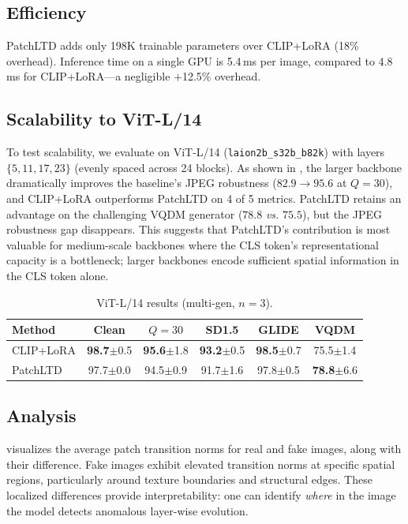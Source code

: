 \documentclass[runningheads]{llncs}
\newcommand{\ours}{PatchLTD}
\newcommand{\vs}{\textit{vs.}}
\begin{document}
\subsection{Efficiency}

\ours{} adds only 198K trainable parameters over CLIP+LoRA (18\% overhead).
Inference time on a single GPU is 5.4\,ms per image, compared to 4.8\,ms for CLIP+LoRA---a negligible $+$12.5\% overhead.


\subsection{Scalability to ViT-L/14}
\label{sec:vitl}

To test scalability, we evaluate on ViT-L/14 (\texttt{laion2b\_s32b\_b82k}) with layers $\{5,11,17,23\}$ (evenly spaced across 24 blocks).
As shown in , the larger backbone dramatically improves the baseline's JPEG robustness ($82.9 \to 95.6$ at $Q{=}30$), and CLIP+LoRA outperforms \ours{} on 4 of 5 metrics.
\ours{} retains an advantage on the challenging VQDM generator ($78.8$ \vs{} $75.5$), but the JPEG robustness gap disappears.
This suggests that \ours{}'s contribution is most valuable for medium-scale backbones where the CLS token's representational capacity is a bottleneck; larger backbones encode sufficient spatial information in the CLS token alone.

\begin{table}[t]
\centering
\caption{ViT-L/14 results (multi-gen, $n{=}3$).}
\label{tab:vitl}
\setlength{\tabcolsep}{4pt}
\begin{tabular}{lccccc}
\toprule
Method & Clean & $Q{=}30$ & SD1.5 & GLIDE & VQDM \\
\midrule
CLIP+LoRA  & \textbf{98.7}\scriptsize$\pm$0.5 & \textbf{95.6}\scriptsize$\pm$1.8 & \textbf{93.2}\scriptsize$\pm$0.5 & \textbf{98.5}\scriptsize$\pm$0.7 & 75.5\scriptsize$\pm$1.4 \\
\ours{}    & 97.7\scriptsize$\pm$0.0 & 94.5\scriptsize$\pm$0.9 & 91.7\scriptsize$\pm$1.6 & 97.8\scriptsize$\pm$0.5 & \textbf{78.8}\scriptsize$\pm$6.6 \\
\bottomrule
\end{tabular}
\end{table}


\subsection{Analysis}
\label{sec:analysis}

 visualizes the average patch transition norms for real and fake images, along with their difference.
Fake images exhibit elevated transition norms at specific spatial regions, particularly around texture boundaries and structural edges.
These localized differences provide interpretability: one can identify \emph{where} in the image the model detects anomalous layer-wise evolution.
\end{document}
